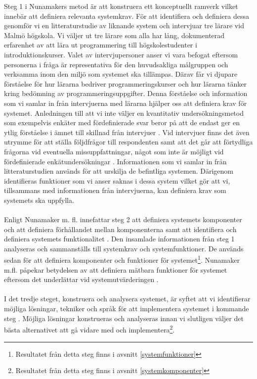 \documentclass[a4paper,11pt]{article}
\begin{document}
{Steg 1 i Nunamakers metod är att konstruera ett konceptuellt ramverk vilket innebär att definiera relevanta systemkrav. För att identifiera och definiera dessa genomför vi en litteraturstudie av liknande system och intervjuar tre lärare vid Malmö högskola. Vi väljer ut tre lärare som alla har lång, dokumenterad erfarenhet av att lära ut programmering till högskolestudenter i introduktionskurser. Valet av intervjupersoner anser vi vara befogat eftersom personerna i fråga är representativa för den huvudsakliga målgruppen och verksamma inom den miljö som systemet ska tillämpas. Därav får vi djupare förståelse för hur lärarna bedriver programmeringskurser och hur lärarna tänker kring bedömning av programmeringsuppgifter. Denna förståelse och information som vi samlar in från intervjuerna med lärarna hjälper oss att definiera krav för systemet.
Anledningen till att vi inte väljer en kvantitativ undersökningsmetod som exempelvis enkäter med fördefinierade svar beror på att de endast ger en ytlig förståelse i ämnet till skillnad från intervjuer \cite{seminarieboken}. Vid intervjuer finns det även utrymme för att ställa följdfrågor till respondenten samt att det går att förtydliga frågorna vid eventuella missuppfattningar, något som inte är möjligt vid fördefinierade enkätundersökningar \cite{seminarieboken}. Informationen som vi samlar in från litteraturstudien används för att urskilja de befintliga systemen. Därigenom identifieras funktioner som vi anser saknas i dessa system vilket gör att vi, tillsammans med informationen från intervjuerna, kan definiera krav som systemets ska uppfylla.
\\
\\
Enligt Nunamaker m. fl. innefattar steg 2 att definiera systemets komponenter och att definiera förhållandet mellan komponenterna samt att identifiera och definiera systemets funktionalitet \cite{nunamaker}. Den insamlade informationen från steg 1 analyseras och sammanställs till systemkrav och systemfunktioner. De används sedan för att definiera komponenter och funktioner för systemet\footnote{Resultatet från detta steg finns i avsnitt \ref{systemfunktioner}}. Nunamaker m.fl. påpekar betydelsen av att definiera mätbara funktioner för systemet eftersom det underlättar vid systemutvärderingen \cite{nunamaker}.
\\
\\
I det tredje steget, konstruera och analysera systemet, är syftet att vi identifierar möjliga lösningar, tekniker och språk för att implementera systemet i kommande steg \cite{nunamaker}. Möjliga lösningar konstrueras och analyseras innan vi slutligen väljer det bästa alternativet att gå vidare med och implementera\footnote{Resultatet från detta steg finns i avsnitt \ref{systemkomponenter}}.
}
\end{document}
